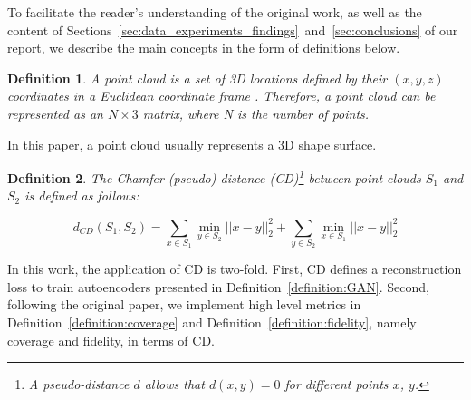 \documentclass[12pt]{article}
\newtheorem{definition}{Definition}
\begin{document}
    To facilitate the reader's understanding of the original work, as well as the content of Sections~\ref{sec:data_experiments_findings}~and~\ref{sec:conclusions} of our report, we describe the main concepts in the form of definitions below.

    \begin{definition}
        \normalfont
        A \emph{point cloud} is a set of 3D locations defined by their $(x, y, z)$ coordinates in a Euclidean coordinate frame \cite{pmlr-v80-achlioptas18a}. Therefore, a point cloud can be represented as an $N \times 3$ matrix, where N is the number of points.
        \label{definition:point_cloud}
    \end{definition}

    In this paper, a point cloud usually represents a 3D shape surface.

    \begin{definition}
        \normalfont
        The \emph{Chamfer (pseudo)-distance (CD)}\footnote{
            A pseudo-distance $d$ allows that $d(x, y) = 0$ for different points $x$, $y$.} between point clouds $S_1$ and $S_2$ is defined as follows:

        \begin{equation}
            d_{CD}(S_{1}, S_{2}) =
            \sum_{x \in S_{1}} \min _{y \in S_{2}} || x - y||_{2}^{2} + \sum_{y \in S_{2}} \min_{x \in S_{1}} ||x - y||_{2}^{2}
            \label{equation:chamfer_distance}
        \end{equation}
        \label{definition:chamfer_distance}
    \end{definition}

    In this work, the application of CD is two-fold. First, CD defines a reconstruction loss to train autoencoders presented in Definition~\ref{definition:GAN}. Second, following the original paper, we implement high level metrics in Definition~\ref{definition:coverage} and Definition~\ref{definition:fidelity}, namely coverage and fidelity, in terms of CD.
\end{document}
